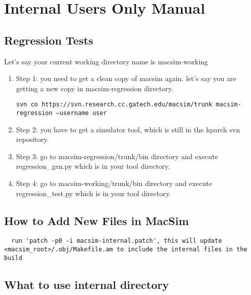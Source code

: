 
\clearpage
\section{Internal Users Only Manual}
\subsection{Regression Tests}
\label{sec:regression}

Let's say your current working directory name is macsim-working

\begin{enumerate}

\item Step 1: you need to get a clean copy of macsim again. let's say you are getting a new copy in macsim-regression directory.

{\tt svn co https://svn.research.cc.gatech.edu/macsim/trunk macsim-regression --username user }

\item Step 2: you have to get a simulator tool, which is still in the hparch svn repository.

\item Step 3: go to macsim-regression/trunk/bin directory and execute regression\_gen.py which is in your tool directory.

\item Step 4: go to macsim-working/trunk/bin directory and execute regression\_test.py which is in your tool directory. 

\end{enumerate}


\subsection{How to Add New Files in MacSim}

\begin{verbatim}  run 'patch -p0 -i macsim-internal.patch', this will update <macsim_root>/.obj/Makefile.am to include the internal files in the build \end{verbatim}


\subsection{What to use internal directory}
